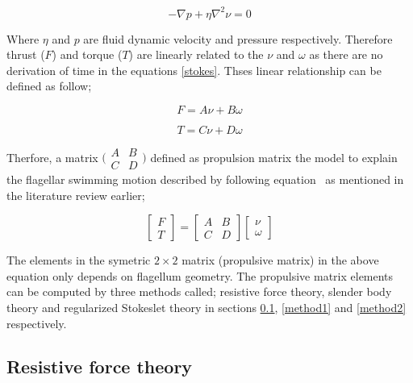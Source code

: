 \documentclass[12pt,a4paper,titlepage]{report}
\begin{document}
\begin{equation}
  -\nabla{p}+ \eta\nabla^2{\nu}  = 0
\label{stokes}
\end{equation}

Where $\eta$ and $p$ are fluid dynamic velocity and pressure respectively. Therefore thrust ($F$) and 
torque ($T$) are linearly related to the $\nu$ and $\omega$ as there are no derivation of time in 
the equations \ref{stokes}. Thses linear relationship can be defined as follow;


\begin{equation}
  F  = A\nu + B\omega
\label{linear1}
\end{equation}

\begin{equation}
  T = C\nu + D\omega
\label{linear2}
\end{equation}


 Therfore, a matrix 
$\bigl(\begin{smallmatrix}
A&B\\ C&D
\end{smallmatrix} \bigr)$
 defined as propulsion matrix the
model to explain the flagellar swimming motion described by following equation~\citep{rodenborn2013propulsion}
as mentioned in the literature review earlier;
 

\[
\begin{bmatrix} F\\ 
T\end{bmatrix}  = \begin{bmatrix} A & B \\ 
C & D \end{bmatrix}  \begin{bmatrix} \nu
 \\ \omega
\end{bmatrix}
\]

The elements in the symetric $2\times2$ matrix (propulsive matrix) in the above equation only depends on 
flagellum geometry. The propulsive matrix elements can be computed by three methods called;
resistive force theory, slender body theory and regularized Stokeslet theory in sections \ref{method3}, 
\ref{method1} and \ref{method2} respectively. 





\subsection{Resistive force theory}\label{method3}
\end{document}

